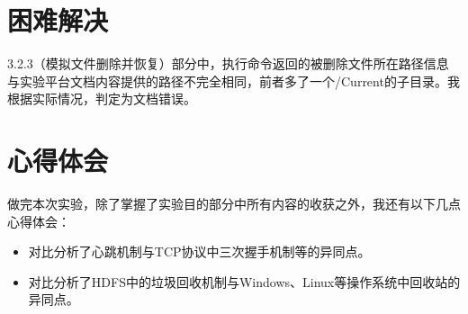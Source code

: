 \documentclass {article}
\begin{document}
	\section{困难解决}
		3.2.3（模拟文件删除并恢复）部分中，执行命令返回的被删除文件所在路径信息与实验平台文档内容提供的路径不完全相同，前者多了一个/Current的子目录。我根据实际情况，判定为文档错误。
	
	\section{心得体会}
		做完本次实验，除了掌握了实验目的部分中所有内容的收获之外，我还有以下几点心得体会：
		\begin{itemize}
			\item 对比分析了心跳机制与TCP协议中三次握手机制等的异同点。
			\item 对比分析了HDFS中的垃圾回收机制与Windows、Linux等操作系统中回收站的异同点。
		\end{itemize}
	
\end{document}

